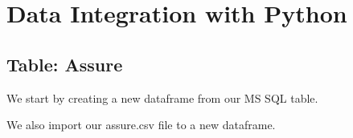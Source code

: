 \clearpage
\section{Data Integration with Python}
\subsection{Table: Assure}

We start by creating a new dataframe from our MS SQL table.
\begin{figure}[H]
\centering
{}
\end{figure}
\begin{figure}[H]
\centering
{}
\end{figure}

We also import our assure.csv file to a new dataframe.
\begin{figure}[H]
\centering
{}
\end{figure}
\begin{figure}[H]
\centering
{}
\end{figure}

